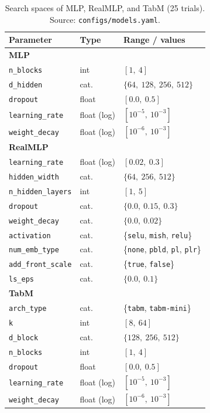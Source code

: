 \begin{table}[htbp]
\centering\footnotesize
\caption[Search spaces --- MLPs and parametric ensembles]{Search
spaces of MLP, RealMLP, and TabM (25 trials). Source:
\texttt{configs/\allowbreak models.\allowbreak yaml}.}
\label{tab:app-busca-mlp}
\begin{tabular}{lll}
\toprule
Parameter & Type & Range / values \\
\midrule
\multicolumn{3}{l}{\textbf{MLP}} \\
\texttt{n\_blocks}      & int   & $[1,\ 4]$ \\
\texttt{d\_hidden}      & cat.  & $\{64,\ 128,\ 256,\ 512\}$ \\
\texttt{dropout}        & float & $[0.0,\ 0.5]$ \\
\texttt{learning\_rate} & float (log) & $[10^{-5},\ 10^{-3}]$ \\
\texttt{weight\_decay}  & float (log) & $[10^{-6},\ 10^{-3}]$ \\
\midrule
\multicolumn{3}{l}{\textbf{RealMLP}} \\
\texttt{learning\_rate}    & float (log) & $[0.02,\ 0.3]$ \\
\texttt{hidden\_width}     & cat. & $\{64,\ 256,\ 512\}$ \\
\texttt{n\_\allowbreak hidden\_\allowbreak layers} & int  & $[1,\ 5]$ \\
\texttt{dropout}           & cat. & $\{0.0,\ 0.15,\ 0.3\}$ \\
\texttt{weight\_decay}     & cat. & $\{0.0,\ 0.02\}$ \\
\texttt{activation}        & cat. & \{\texttt{selu}, \texttt{mish},
  \texttt{relu}\} \\
\texttt{num\_emb\_type}    & cat. & \{\texttt{none}, \texttt{pbld},
  \texttt{pl}, \texttt{plr}\} \\
\texttt{add\_\allowbreak front\_\allowbreak scale} & cat. & \{\texttt{true}, \texttt{false}\} \\
\texttt{ls\_eps}           & cat. & $\{0.0,\ 0.1\}$ \\
\midrule
\multicolumn{3}{l}{\textbf{TabM}} \\
\texttt{arch\_type}     & cat.  & \{\texttt{tabm}, \texttt{tabm-mini}\} \\
\texttt{k}              & int   & $[8,\ 64]$ \\
\texttt{d\_block}       & cat.  & $\{128,\ 256,\ 512\}$ \\
\texttt{n\_blocks}      & int   & $[1,\ 4]$ \\
\texttt{dropout}        & float & $[0.0,\ 0.5]$ \\
\texttt{learning\_rate} & float (log) & $[10^{-5},\ 10^{-3}]$ \\
\texttt{weight\_decay}  & float (log) & $[10^{-6},\ 10^{-3}]$ \\
\bottomrule
\end{tabular}
\end{table}

